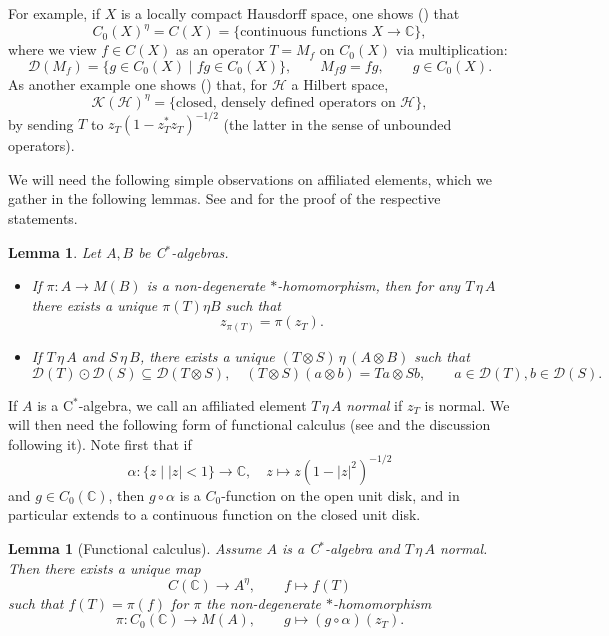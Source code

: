 \documentclass[11pt, reqno]{amsart}
\newtheorem{lemma}[theorem]{Lemma}
\theoremstyle{definition}
\numberwithin{equation}{section}
\def\C{\mathbb C}
\def\msD{\mathscr D}
\def\Hc{\mathcal H}
\newcommand{\Hsp}{\mathcal{H}}
\newcommand{\Kc}{\mathcal{K}}
\begin{document}
For example, if $X$ is a locally compact Hausdorff space, one shows (\cite[Example 2]{Wor91}) that 
\[
C_0(X)^{\eta} = C(X) = \{\textrm{continuous functions }X \rightarrow \C\},
\]
where we view $f \in C(X)$ as an operator $T = M_f$ on $C_0(X)$ via multiplication: 
\[
\msD(M_f) = \{g\in C_0(X) \mid fg \in C_0(X)\},\qquad M_fg = fg,\qquad g\in C_0(X). 
\]
As another example one shows (\cite[Example 3]{Wor91}) that, for $\Hsp$ a Hilbert space,
\[
\Kc(\Hc)^{\eta} = \{\textrm{closed, densely defined operators on }\Hsp\},
\]
by sending $T$ to $z_T(1-z_T^*z_T)^{-1/2}$ (the latter in the sense of unbounded operators). 

We will need the following simple observations on affiliated elements, which we gather in the following lemmas. See \cite[Theorem 1.2]{Wor91} and  \cite[Theorem 6.1]{WN92} for the proof of the respective statements.

\begin{lemma}\label{LemHomCorr}
Let $A,B$ be C$^*$-algebras.
\begin{itemize}
\item If $\pi\colon  A \rightarrow M(B)$ is a non-degenerate $*$-homomorphism, then for any $T \,\eta\, A$ there exists a unique $\pi(T) \eta B$ such that 
\[
z_{\pi(T)} = \pi(z_T).
\]

\item If $T\, \eta\, A$ and $S\, \eta\, B$, there exists a unique $ (T \otimes S) \,\eta\, (A\otimes B)$ such that 
\begin{equation}\label{EqAffiliTens}
\msD(T)\odot \msD(S) \subseteq \msD(T\otimes S),\quad (T\otimes S)(a\otimes b) = Ta\otimes Sb,\qquad a\in \msD(T),b\in \msD(S).
\end{equation}
\end{itemize}
\end{lemma}

If $A$ is a C$^*$-algebra, we call
an affiliated element $T \,\eta\, A$ \emph{normal} if $z_T$ is normal. We will then need the following form of functional calculus (see \cite[Theorem 1.5, Theorem 1.6]{Wor91} and the discussion following it). Note first that if 
\[
\alpha\colon  \{z\mid |z|<1\} \rightarrow \C,\quad z\mapsto z(1-|z|^2)^{-1/2}
\]
and $g \in C_0(\C)$, then $g\circ \alpha$ is a $C_0$-function on the open unit disk, and in particular extends to a continuous function on the closed unit disk. 

\begin{lemma}[Functional calculus]\label{LemFunctCal}
Assume $A$ is a C$^*$-algebra and $T \,\eta\, A$ normal. Then there exists a unique map 
\[
C(\C) \rightarrow A^{\eta},\qquad f \mapsto f(T)
\]
such that $f(T) = \pi(f)$ for $\pi$ the non-degenerate $*$-homomorphism
\[
\pi\colon  C_0(\C) \rightarrow M(A),\qquad g \mapsto (g\circ \alpha)(z_T).
\]
\end{lemma} 
\end{document}
